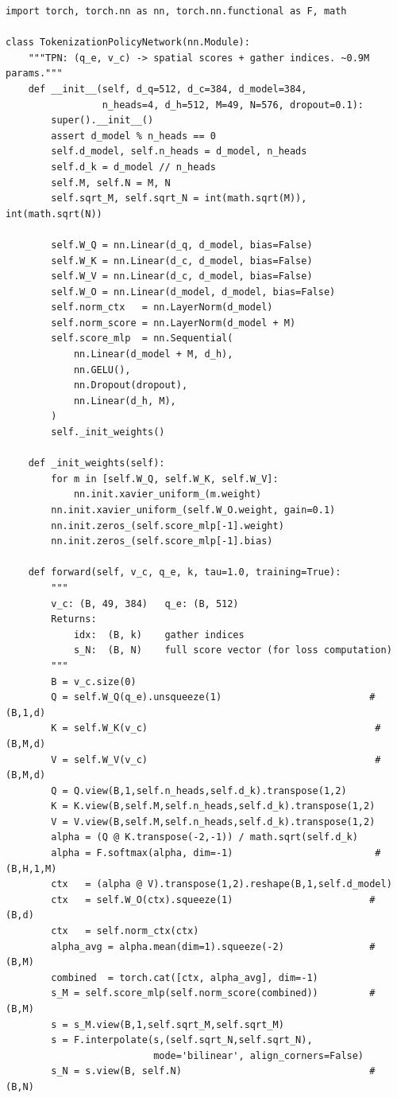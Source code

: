 \documentclass[11pt,a4paper]{article}
\begin{document}
\begin{lstlisting}[caption={TokenizationPolicyNetwork: full implementation.}]
import torch, torch.nn as nn, torch.nn.functional as F, math

class TokenizationPolicyNetwork(nn.Module):
    """TPN: (q_e, v_c) -> spatial scores + gather indices. ~0.9M params."""
    def __init__(self, d_q=512, d_c=384, d_model=384,
                 n_heads=4, d_h=512, M=49, N=576, dropout=0.1):
        super().__init__()
        assert d_model % n_heads == 0
        self.d_model, self.n_heads = d_model, n_heads
        self.d_k = d_model // n_heads
        self.M, self.N = M, N
        self.sqrt_M, self.sqrt_N = int(math.sqrt(M)), int(math.sqrt(N))

        self.W_Q = nn.Linear(d_q, d_model, bias=False)
        self.W_K = nn.Linear(d_c, d_model, bias=False)
        self.W_V = nn.Linear(d_c, d_model, bias=False)
        self.W_O = nn.Linear(d_model, d_model, bias=False)
        self.norm_ctx   = nn.LayerNorm(d_model)
        self.norm_score = nn.LayerNorm(d_model + M)
        self.score_mlp  = nn.Sequential(
            nn.Linear(d_model + M, d_h),
            nn.GELU(),
            nn.Dropout(dropout),
            nn.Linear(d_h, M),
        )
        self._init_weights()

    def _init_weights(self):
        for m in [self.W_Q, self.W_K, self.W_V]:
            nn.init.xavier_uniform_(m.weight)
        nn.init.xavier_uniform_(self.W_O.weight, gain=0.1)
        nn.init.zeros_(self.score_mlp[-1].weight)
        nn.init.zeros_(self.score_mlp[-1].bias)

    def forward(self, v_c, q_e, k, tau=1.0, training=True):
        """
        v_c: (B, 49, 384)   q_e: (B, 512)
        Returns:
            idx:  (B, k)    gather indices
            s_N:  (B, N)    full score vector (for loss computation)
        """
        B = v_c.size(0)
        Q = self.W_Q(q_e).unsqueeze(1)                          # (B,1,d)
        K = self.W_K(v_c)                                        # (B,M,d)
        V = self.W_V(v_c)                                        # (B,M,d)
        Q = Q.view(B,1,self.n_heads,self.d_k).transpose(1,2)
        K = K.view(B,self.M,self.n_heads,self.d_k).transpose(1,2)
        V = V.view(B,self.M,self.n_heads,self.d_k).transpose(1,2)
        alpha = (Q @ K.transpose(-2,-1)) / math.sqrt(self.d_k)
        alpha = F.softmax(alpha, dim=-1)                         # (B,H,1,M)
        ctx   = (alpha @ V).transpose(1,2).reshape(B,1,self.d_model)
        ctx   = self.W_O(ctx).squeeze(1)                        # (B,d)
        ctx   = self.norm_ctx(ctx)
        alpha_avg = alpha.mean(dim=1).squeeze(-2)               # (B,M)
        combined  = torch.cat([ctx, alpha_avg], dim=-1)
        s_M = self.score_mlp(self.norm_score(combined))         # (B,M)
        s = s_M.view(B,1,self.sqrt_M,self.sqrt_M)
        s = F.interpolate(s,(self.sqrt_N,self.sqrt_N),
                          mode='bilinear', align_corners=False)
        s_N = s.view(B, self.N)                                 # (B,N)


\end{lstlisting}
\end{document}
